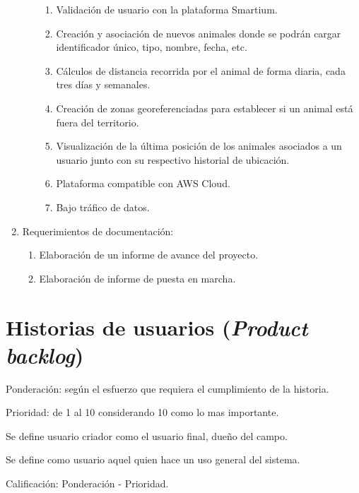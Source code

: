 \documentclass[11pt]{charter}
\begin{document}
\begin{enumerate}
\begin{enumerate}
\begin{enumerate}
		\item Validación de usuario con la plataforma Smartium.
		\item Creación y asociación de nuevos animales donde se podrán cargar identificador único, tipo, nombre, fecha, etc.
		\item Cálculos de distancia recorrida por el animal de forma diaria, cada tres días y semanales.
		\item Creación de zonas georeferenciadas para establecer si un animal está fuera del territorio.
		\item Visualización de la última posición de los animales asociados a un usuario junto con su respectivo historial de ubicación.
		\item Plataforma compatible con AWS Cloud.
		\item Bajo tráfico de datos.
		\end{enumerate}
	\end{enumerate}
\item Requerimientos de documentación:
	\begin{enumerate}
	\item Elaboración de un informe de avance del proyecto.
	\item Elaboración de informe de puesta en marcha.
	\end{enumerate}	
\end{enumerate}



\section{Historias de usuarios (\textit{Product backlog})}
\label{sec:backlog}

Ponderación: según el esfuerzo que requiera el cumplimiento de la historia.

Prioridad: de 1 al 10 considerando 10 como lo mas importante.

Se define usuario criador como el usuario final, dueño del campo.

Se define como usuario aquel quien hace un uso general del sistema.

Calificación: Ponderación - Prioridad.
\end{document}
